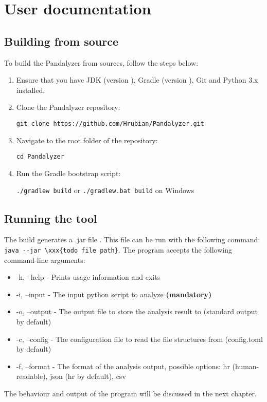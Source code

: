 \chapter{User documentation}\label{ch:user-documentation}


\section{Building from source}

To build the Pandalyzer from sources, follow the steps below:
\begin{enumerate}
    \item Ensure that you have JDK (version ), Gradle (version ), Git
    and Python 3.x installed.
    \item Clone the Pandalyzer repository:

    \verb|git clone https://github.com/Hrubian/Pandalyzer.git|
    \item Navigate to the root folder of the repository:

    \verb|cd Pandalyzer|
    \item Run the Gradle bootstrap script:

    \verb|./gradlew build| or \verb|./gradlew.bat build| on Windows
\end{enumerate}

\section{Running the tool}

The build generates a .jar file .
This file can be run with the following command:
\verb|java --jar \xxx{todo file path}|.
The program accepts the following command-line arguments:
\begin{itemize}
    \item -h, --help - Prints usage information and exits
    \item -i, --input - The input python script to analyze \textbf{(mandatory)}
    \item -o, --output - The output file to store the analysis result to (standard output by default)
    \item -c, --config - The configuration file to read the file structures from (config.toml by default)
    \item -f, --format - The format of the analysis output, possible options: hr (human-readable), json (hr by default), csv
\end{itemize}

The behaviour and output of the program will be discussed in the next chapter.
